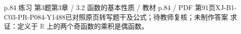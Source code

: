 \par\noindent\begin{minipage}{\linewidth}
\begin{bankitem}{p.84 练习 第3题}{第3章 / 3.2 函数的基本性质 / 教材 p.84 / PDF 第91页}{XJ-B1-C03-PR-P084-Y1488}{已对照原页转写题干及公式；待教师复核；未制作答案}
求证：定义于 $\mathbb R$ 上的两个奇函数的乘积是偶函数。
\end{bankitem}
\end{minipage}\par\medskip
